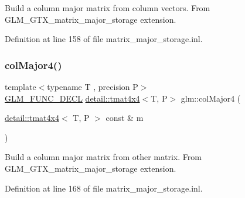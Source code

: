 Build a column major matrix from column vectors. From G\+L\+M\+\_\+\+G\+T\+X\+\_\+matrix\+\_\+major\+\_\+storage extension. 

Definition at line 158 of file matrix\+\_\+major\+\_\+storage.\+inl.

\mbox{\label{group__gtx__matrix__major__storage_ga89086c0396205669304be98a8c601b78}} 
\subsubsection{\texorpdfstring{col\+Major4()}{colMajor4()}\hspace{0.1cm}{\footnotesize\ttfamily [2/2]}}
{\footnotesize\ttfamily template$<$typename T , precision P$>$ \\
\hyperlink{setup_8hpp_ab2d052de21a70539923e9bcbf6e83a51}{G\+L\+M\+\_\+\+F\+U\+N\+C\+\_\+\+D\+E\+CL} \hyperlink{structglm_1_1detail_1_1tmat4x4}{detail\+::tmat4x4}$<$T, P$>$ glm\+::col\+Major4 (\begin{DoxyParamCaption}\item[{\hyperlink{structglm_1_1detail_1_1tmat4x4}{detail\+::tmat4x4}$<$ T, P $>$ const \&}]{m }\end{DoxyParamCaption})}

Build a column major matrix from other matrix. From G\+L\+M\+\_\+\+G\+T\+X\+\_\+matrix\+\_\+major\+\_\+storage extension. 

Definition at line 168 of file matrix\+\_\+major\+\_\+storage.\+inl.

\mbox{\label{group__gtx__matrix__major__storage_ga63d72819ad07f4f875a0565f1462652b}} 
